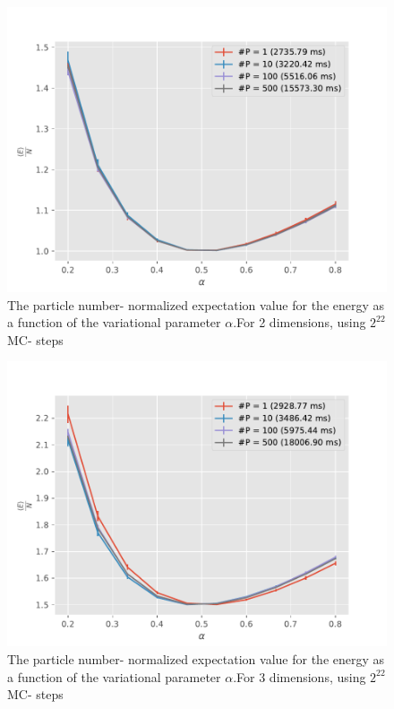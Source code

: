 \documentclass[11pt,a4paper,titlepage]{article}
\begin{document}
\begin{figure}[H]
\centering

\includegraphics[trim=0cm 0.0cm 0cm 1.0cm, clip=true,scale = 0.7]{HarmonicOscillator_SimpleGaussian_D2_2pow22_analytic.pdf}
\caption[No interaction (2D)]{The particle number- normalized expectation value for the energy as a function of the variational parameter $\alpha$.For 2 dimensions, using $2^{22}$ MC- steps}\label{2dUncorrolated}
\end{figure}

\begin{figure}[H]
\centering

\includegraphics[trim=0cm 0.0cm 0cm 1.0cm, clip=true,scale = 0.7]{HarmonicOscillator_SimpleGaussian_D3_2pow22_analytic_NoTitle.pdf}
\caption[No interaction (3D)]{The particle number- normalized expectation value for the energy as a function of the variational parameter $\alpha$.For 3 dimensions, using $2^{22}$ MC- steps}\label{3dUncorrolated}
\end{figure}
\end{document}
